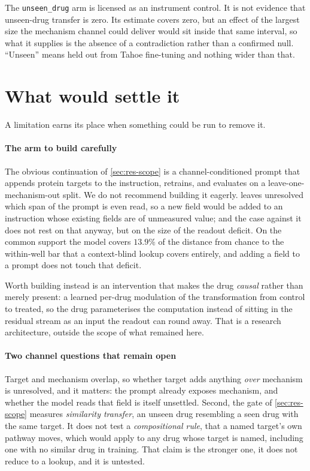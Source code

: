 \begin{scopelimit}
The \texttt{unseen\_drug} arm is licensed as an instrument control. It is not
evidence that unseen-drug transfer is zero. Its estimate covers zero, but an
effect of the largest size the mechanism channel could deliver would sit inside
that same interval, so what it supplies is the absence of a contradiction rather
than a confirmed null. ``Unseen'' means held out from Tahoe fine-tuning and
nothing wider than that.
\end{scopelimit}

\section{What would settle it}
\label{sec:lim-future}

A limitation earns its place when something could be run to remove it.

\paragraph{The arm to build carefully} The obvious continuation of
\cref{sec:res-scope} is a channel-conditioned prompt that appends protein targets
to the instruction, retrains, and evaluates on a leave-one-mechanism-out split.
We do not recommend building it eagerly.  leaves unresolved
which span of the prompt is even read, so a new field would be added to an
instruction whose existing fields are of unmeasured value; and the case against
it does not rest on that anyway, but on the size of the readout deficit. On the
common support the model covers $13.9\%$ of the distance from chance to the
within-well bar that a context-blind lookup covers entirely, and adding a field
to a prompt does not touch that deficit.

Worth building instead is an intervention that makes the drug \emph{causal}
rather than merely present: a learned per-drug modulation of the transformation
from control to treated, so the drug parameterises the computation instead of
sitting in the residual stream as an input the readout can round away. That is a
research architecture, outside the scope of what remained here.

\paragraph{Two channel questions that remain open} Target and mechanism overlap,
so whether target adds anything \emph{over} mechanism is unresolved, and it
matters: the prompt already exposes mechanism, and whether the model reads that
field is itself unsettled. Second, the gate of \cref{sec:res-scope}
measures \emph{similarity transfer}, an unseen drug resembling a seen drug with
the same target. It does not test a \emph{compositional rule}, that a named
target's own pathway moves, which would apply to any drug whose target is named,
including one with no similar drug in training. That claim is the stronger one,
it does not reduce to a lookup, and it is untested.

